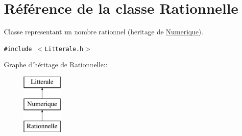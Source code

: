 \hypertarget{class_rationnelle}{
\section{Référence de la classe Rationnelle}
\label{class_rationnelle}
}
Classe representant un nombre rationnel (heritage de \hyperlink{class_numerique}{Numerique}).  


{\tt \#include $<$Litterale.h$>$}

Graphe d'héritage de Rationnelle::\begin{figure}[H]
\begin{center}
\leavevmode
\includegraphics[height=3cm]{class_rationnelle}
\end{center}
\end{figure}

